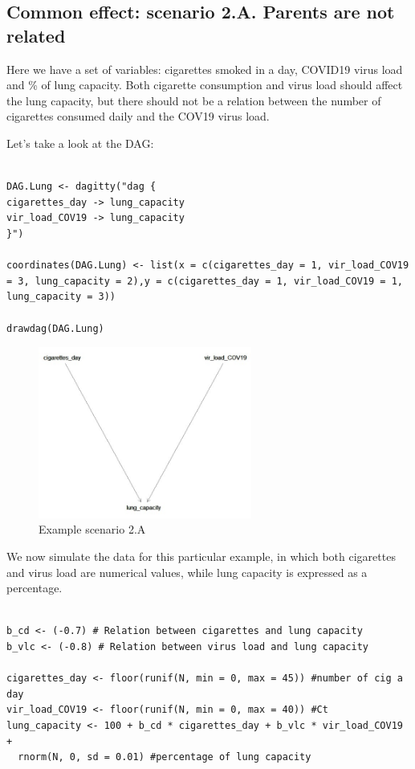 \documentclass{article}
\begin{document}
\subsection{Common effect: scenario 2.A. Parents are not related}

Here we have a set of variables: cigarettes smoked in a day, COVID19 virus load and \% of lung capacity. Both cigarette consumption and virus load should affect the lung capacity, but there should not be a relation between the number of cigarettes consumed daily and the COV19 virus load.\par

Let's take a look at the DAG:\par

\begin{lstlisting}

DAG.Lung <- dagitty("dag {
cigarettes_day -> lung_capacity
vir_load_COV19 -> lung_capacity
}")

coordinates(DAG.Lung) <- list(x = c(cigarettes_day = 1, vir_load_COV19 = 3, lung_capacity = 2),y = c(cigarettes_day = 1, vir_load_COV19 = 1, lung_capacity = 3))

drawdag(DAG.Lung)
\end{lstlisting}

\begin{figure}[h]
\caption{Example scenario 2.A}
\includegraphics[width=7cm]{DAG_CIG_LUNG.png}
\centering
\end{figure}
We now simulate the data for this particular example, in which both cigarettes and virus load are numerical values, while lung capacity is expressed as a percentage.\par

\begin{lstlisting}

b_cd <- (-0.7) # Relation between cigarettes and lung capacity
b_vlc <- (-0.8) # Relation between virus load and lung capacity 

cigarettes_day <- floor(runif(N, min = 0, max = 45)) #number of cig a day
vir_load_COV19 <- floor(runif(N, min = 0, max = 40)) #Ct
lung_capacity <- 100 + b_cd * cigarettes_day + b_vlc * vir_load_COV19 + 
  rnorm(N, 0, sd = 0.01) #percentage of lung capacity

\end{lstlisting}
\end{document}
